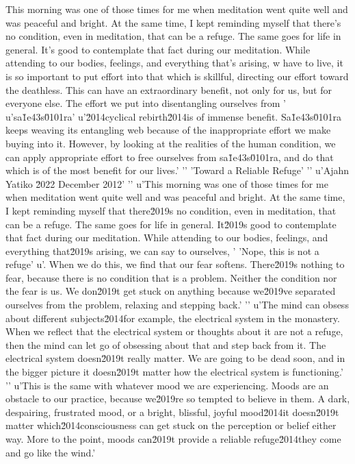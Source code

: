 This morning was one of those times for me when meditation went quite 
well and was peaceful and bright. At the same time, I kept reminding 
myself that there's no condition, even in meditation, that can be a 
refuge. The same goes for life in general. It's good to contemplate 
that fact during our meditation. While attending to our bodies, 
feelings, and everything that's arising, w have to live, it is so important to put effort into that which is skillful, directing our effort toward the deathless. This can have an extraordinary benefit, not only for us, but for everyone else. The effort we put into disentangling ourselves from '
u'sa\u1e43s\u0101ra'
u'\u2014cyclical rebirth\u2014is of immense benefit. Sa\u1e43s\u0101ra keeps weaving its entangling web because of the inappropriate effort we make buying into it. However, by looking at the realities of the human condition, we can apply appropriate effort to free ourselves from sa\u1e43s\u0101ra, and do that which is of the most benefit for our lives.'
'\n'
'Toward a Reliable Refuge'
'\n'
u'Ajahn Yatiko \u2022 December 2012'
'\n'
u'This morning was one of those times for me when meditation went quite well and was peaceful and bright. At the same time, I kept reminding myself that there\u2019s no condition, even in meditation, that can be a refuge. The same goes for life in general. It\u2019s good to contemplate that fact during our meditation. While attending to our bodies, feelings, and everything that\u2019s arising, we can say to ourselves, '
'Nope, this is not a refuge'
u'. When we do this, we find that our fear softens. There\u2019s nothing to fear, because there is no condition that is a problem. Neither the condition nor the fear is us. We don\u2019t get stuck on anything because we\u2019ve separated ourselves from the problem, relaxing and stepping back.'
'\n'
u'The mind can obsess about different subjects\u2014for example, the electrical system in the monastery. When we reflect that the electrical system or thoughts about it are not a refuge, then the mind can let go of obsessing about that and step back from it. The electrical system doesn\u2019t really matter. We are going to be dead soon, and in the bigger picture it doesn\u2019t matter how the electrical system is functioning.'
'\n'
u'This is the same with whatever mood we are experiencing. Moods are an obstacle to our practice, because we\u2019re so tempted to believe in them. A dark, despairing, frustrated mood, or a bright, blissful, joyful mood\u2014it doesn\u2019t matter which\u2014consciousness can get stuck on the perception or belief either way. More to the point, moods can\u2019t provide a reliable refuge\u2014they come and go like the wind.'
